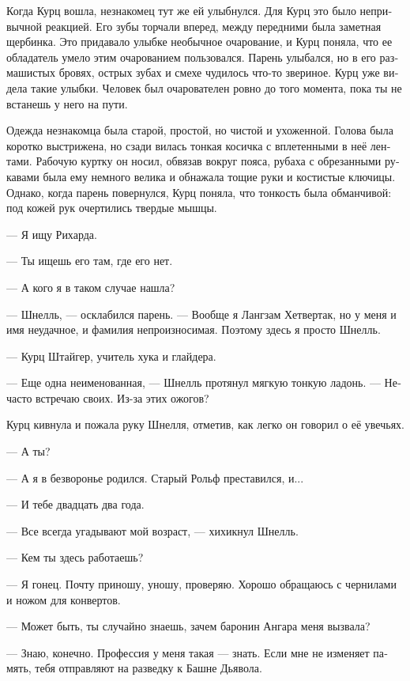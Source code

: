 \documentclass[a4paper,10pt,fleqn]{book}\usepackage{polyglossia}\setdefaultlanguage[babelshorthands=true]{russian}\setotherlanguage{english}\defaultfontfeatures{Ligatures=TeX,Mapping=tex-text}\usepackage{xcolor}\newcommand{\ml}[3]{#2}
\begin{document}
Когда Курц вошла, незнакомец тут же ей улыбнулся.
Для Курц это было непривычной реакцией.
Его зубы торчали вперед, между передними была заметная щербинка.
Это придавало улыбке необычное очарование, и Курц поняла, что ее обладатель умело этим очарованием пользовался.
Парень улыбался, но в его размашистых бровях, острых зубах и смехе чудилось что-то звериное.
Курц уже видела такие улыбки.
Человек был очарователен ровно до того момента, пока ты не встанешь у него на пути.

Одежда незнакомца была старой, простой, но чистой и ухоженной.
Голова была коротко выстрижена, но сзади вилась тонкая косичка с вплетенными в неё лентами.
Рабочую куртку он носил, обвязав вокруг пояса, рубаха с обрезанными рукавами была ему немного велика и обнажала тощие руки и костистые ключицы.
Однако, когда парень повернулся, Курц поняла, что тонкость была обманчивой: под кожей рук очертились твердые мышцы. 

--- Я ищу Рихарда.

--- Ты ищешь его там, где его нет.

--- А кого я в таком случае нашла?

--- Шнелль, --- осклабился парень.
--- Вообще я Лангзам Хетвертак, но у меня и имя неудачное, и фамилия непроизносимая.
Поэтому здесь я просто Шнелль.

--- Курц Штайгер, учитель хука и глайдера.

--- Еще одна неименованная, --- Шнелль протянул мягкую тонкую ладонь.
--- Нечасто встречаю своих.
Из-за этих ожогов?

Курц кивнула и пожала руку Шнелля, отметив, как легко он говорил о её увечьях.

--- А ты?

--- А я в безворонье родился.
Старый Рольф преставился, и...

--- И тебе двадцать два года.

--- Все всегда угадывают мой возраст, --- хихикнул Шнелль.

--- Кем ты здесь работаешь?

--- Я гонец.
Почту приношу, уношу, проверяю.
Хорошо обращаюсь с чернилами и ножом для конвертов.

\ml{$0$}
{--- Может быть, ты случайно знаешь, зачем баронин Ангара меня вызвала?}
{``Maybe you know by chance, why Baronin Angara paged me?''}

\ml{$0$}
{--- Знаю, конечно.}
{``Of course I know.}
\ml{$0$}
{Профессия у меня такая --- знать.}
{That's my job, to know.}
\ml{$0$}
{Если мне не изменяет память, тебя отправляют на разведку к Башне Дьявола.}
{If I recall correctly, you're ordered to scout the Teufel Tower.''}
\end{document}
